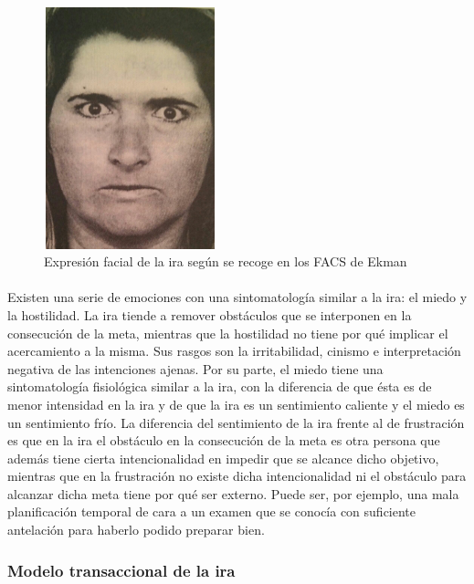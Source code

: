 \begin{figure}[h]
    \centering
    \includegraphics[width=5cm, height=7cm]{Imagenes/ekman-anger}
    \caption[Expresión facial de la ira según se recoge en los FACS de Ekman]{Expresión facial de la ira según se recoge en los FACS de Ekman}
    \label{fig:ekman}
\end{figure}

\paragraph{}
Existen una serie de emociones con una sintomatología similar a la ira: el miedo y la hostilidad. La ira tiende a remover obstáculos que se interponen en la consecución de la meta, mientras que la hostilidad no tiene por qué implicar el acercamiento a la misma. Sus rasgos son la irritabilidad, cinismo e interpretación negativa de las intenciones ajenas. Por su parte, el miedo tiene una sintomatología fisiológica similar a la ira, con la diferencia de que ésta es de menor intensidad en la ira y de que la ira es un sentimiento caliente y el miedo es un sentimiento frío. La diferencia del sentimiento de la ira frente al de frustración es que en la ira el obstáculo en la consecución de la meta es otra persona que además tiene cierta intencionalidad en impedir que se alcance dicho objetivo, mientras que en la frustración no existe dicha intencionalidad ni el obstáculo para alcanzar dicha meta tiene por qué ser externo. Puede ser, por ejemplo, una mala planificación temporal de cara a un examen que se conocía con suficiente antelación para haberlo podido preparar bien.

\subsubsection{Modelo transaccional de la ira}

